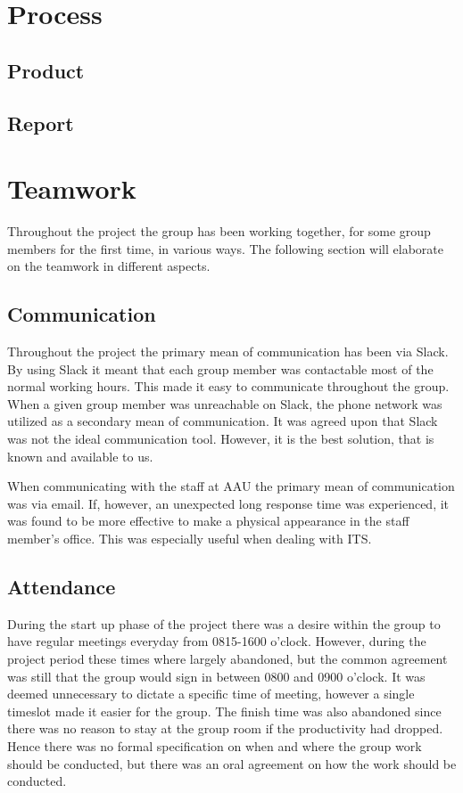 \section{Process}

\subsection{Product}

\subsection{Report}

\section{Teamwork}
Throughout the project the group has been working together, for some group members for the first time, in various ways. 
The following section will elaborate on the teamwork in different aspects. 

\subsection{Communication}
Throughout the project the primary mean of communication has been via Slack. 
By using Slack it meant that each group member was contactable most of the normal working hours.
This made it easy to communicate throughout the group. 
When a given group member was unreachable on Slack, the phone network was utilized as a secondary mean of communication.
It was agreed upon that Slack was not the ideal communication tool. 
However, it is the best solution, that is known and available to us.

When communicating with the staff at AAU the primary mean of communication was via email.
If, however, an unexpected long response time was experienced, it was found to be more effective to make a physical appearance in the staff member's office.
This was especially useful when dealing with ITS.

\subsection{Attendance}
During the start up phase of the project there was a desire within the group to have regular meetings everyday from 0815-1600 o'clock.
However, during the project period these times where largely abandoned, but the common agreement was still that the group would sign in between 0800 and 0900 o'clock.
It was deemed unnecessary to dictate a specific time of meeting, however a single timeslot made it easier for the group. 
The finish time was also abandoned since there was no reason to stay at the group room if the productivity had dropped.
Hence there was no formal specification on when and where the group work should be conducted, but there was an oral agreement on how the work should be conducted.
